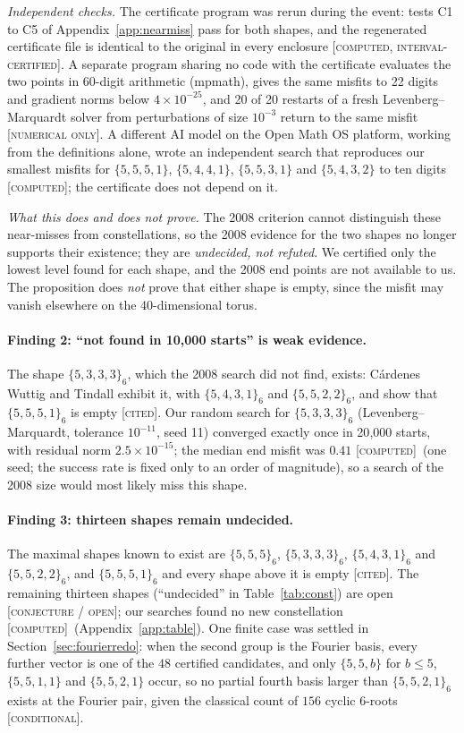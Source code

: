 \documentclass[11pt]{article}
\newcommand{\st}[1]{\textsc{[#1]}}
\newcommand{\stcert}{\st{computed, interval-certified}}
\newcommand{\stcomp}{\st{computed}}
\newcommand{\stnum}{\st{numerical only}}
\newcommand{\stcited}{\st{cited}}
\newcommand{\stcond}{\st{conditional}}
\newcommand{\stconj}{\st{conjecture / open}}
\theoremstyle{definition}
\theoremstyle{remark}
\begin{document}
\noindent\emph{Independent checks.} The certificate program was rerun during the event: tests C1 to C5 of
Appendix~\ref{app:nearmiss} pass for both shapes, and the regenerated certificate file is identical to the original in every
enclosure \stcert. A separate program sharing no code with the certificate evaluates the two points in 60-digit
arithmetic (mpmath), gives the same misfits to 22 digits and gradient norms below $4\times10^{-25}$, and 20 of 20 restarts of
a fresh Levenberg--Marquardt solver from perturbations of size $10^{-3}$ return to the same misfit \stnum. A different AI model on the Open Math OS
platform, working from the definitions alone, wrote an independent search that reproduces our smallest misfits for
$\{5,5,5,1\}$, $\{5,4,4,1\}$, $\{5,5,3,1\}$ and $\{5,4,3,2\}$ to ten digits \stcomp; the certificate does not depend on it.

\noindent\emph{What this does and does not prove.} The 2008 criterion cannot distinguish these near-misses from
constellations, so the 2008 evidence for the two shapes no longer supports their existence; they are \emph{undecided, not
refuted}. We certified only the lowest level found for each shape, and the 2008 end points are not available to us. The
proposition does \emph{not} prove that either shape is empty, since the misfit may vanish elsewhere on the 40-dimensional
torus.

\paragraph{Finding 2: ``not found in 10{,}000 starts'' is weak evidence.} The shape $\{5,3,3,3\}_6$, which the 2008 search
did not find, exists: C\'ardenes Wuttig and Tindall exhibit it, with $\{5,4,3,1\}_6$ and $\{5,5,2,2\}_6$, and show
that $\{5,5,5,1\}_6$ is empty \cite{CWT,Sun,MW12} \stcited. Our random search for $\{5,3,3,3\}_6$ (Levenberg--Marquardt, tolerance $10^{-11}$, seed 11) converged exactly
once in 20{,}000 starts, with residual norm $2.5\times10^{-15}$; the median end misfit was $0.41$ \stcomp\ (one
seed; the success rate is fixed only to an order of magnitude), so a search of the 2008 size would most likely miss this shape.

\paragraph{Finding 3: thirteen shapes remain undecided.} The maximal shapes known to exist are $\{5,5,5\}_6$,
$\{5,3,3,3\}_6$, $\{5,4,3,1\}_6$ and $\{5,5,2,2\}_6$, and $\{5,5,5,1\}_6$ and every shape above it is empty
\cite{BW08,CWT} \stcited. The remaining thirteen shapes (``undecided'' in Table~\ref{tab:const}) are open \stconj; our searches found no new constellation \stcomp\ (Appendix~\ref{app:table}).
One finite case was settled in Section~\ref{sec:fourierredo}: when the second group is the Fourier basis, every further
vector is one of the $48$ certified candidates, and only $\{5,5,b\}$ for $b\le5$, $\{5,5,1,1\}$ and $\{5,5,2,1\}$ occur,
so no partial fourth basis larger than $\{5,5,2,1\}_6$ exists at the Fourier pair, given the classical count of $156$
cyclic $6$-roots \cite{BF91} \stcond.
\end{document}

